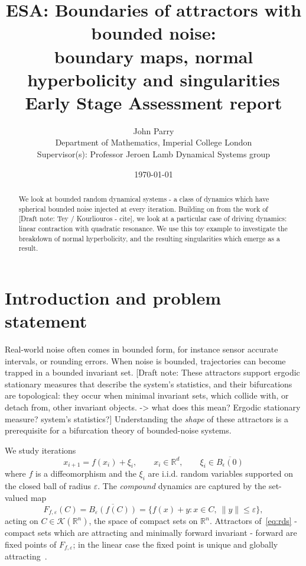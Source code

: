 \documentclass[11pt,a4paper]{article}
\title{\textbf{ESA: Boundaries of attractors with bounded noise:\\ boundary maps, normal hyperbolicity and singularities}\\[0.5em]
\large Early Stage Assessment report}
\author{John Parry\\[0.2em]
\small Department of Mathematics, Imperial College London\\
\small Supervisor(s): Professor Jeroen Lamb \quad Dynamical Systems group}
\date{\today}
\newif\ifdraftnotes \draftnotestrue
\newcommand{\note}[1]{\ifdraftnotes{\color{BrickRed}\textsf{\footnotesize[Draft note: #1]}}\fi}
\theoremstyle{definition}
\theoremstyle{remark}
\newcommand{\R}{\mathbb{R}}
\newcommand{\eps}{\varepsilon}
\begin{document}
\maketitle
\begin{abstract}
    We look at bounded random dynamical systems - a class of dynamics which have spherical bounded noise injected at every iteration. Building on from the work of \note{Tey / Kourliouros - cite}, we look at a particular case of driving dynamics: linear contraction with quadratic resonance. We use this toy example to investigate the breakdown of normal hyperbolicity, and the resulting singularities which emerge as a result.  
\end{abstract}

\tableofcontents

\section{Introduction and problem statement}\label{sec:intro}
Real-world noise often comes in bounded form, for instance sensor accurate intervals, or rounding errors. When noise is bounded, trajectories can become trapped in a bounded invariant set. \note{These attractors support ergodic stationary measures that describe the system's statistics, and their bifurcations are topological: they occur when minimal invariant sets, which collide with, or detach from, other invariant objects. -> what does this mean? Ergodic stationary measure? system's statistics?} Understanding the \emph{shape} of these attractors is a prerequisite for a bifurcation theory of bounded-noise systems.  

\noindent We study iterations
\begin{equation}\label{eq:rds}
    x_{i+1} = f(x_i) + \xi_i,\qquad x_i\in\R^d, \qquad \xi_{i} \in \overline{B_{\epsilon}(0)}
\end{equation}
where $f$ is a diffeomorphism and the $\xi_i$ are i.i.d. random variables supported on the closed ball of radius
$\eps$. The \emph{compound} dynamics are captured by the set-valued map
\[
    F_{f,\eps}(C) = \overline{B_\eps(f(C))} = \{f(x)+y : x\in C,\ \|y\|\le\eps\},
\]
acting on $C \in \mathcal{K}(\R^n)$, the space of compact sets on $\R^n$. Attractors of~\eqref{eq:rds} - compact sets which are attracting and minimally forward invariant -
forward are fixed points of $F_{f,\eps}$; in the linear case the fixed point is unique and globally
attracting~\cite{LRT23,LRR15}.
\end{document}
